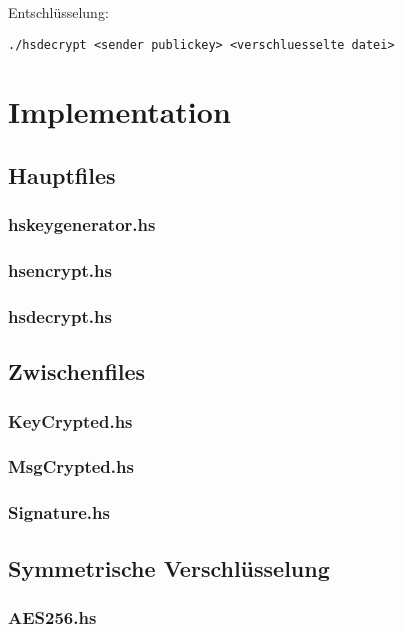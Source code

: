 \documentclass[11pt,a4paper,parskip=half]{scrartcl}
\begin{document}
Entschlüsselung:
\begin{lstlisting}
./hsdecrypt <sender publickey> <verschluesselte datei>
\end{lstlisting}

\newpage
\section{Implementation}
\subsection{Hauptfiles}
\subsubsection{hskeygenerator.hs}

\subsubsection{hsencrypt.hs}

\subsubsection{hsdecrypt.hs}

\subsection{Zwischenfiles}
\subsubsection{KeyCrypted.hs}

\subsubsection{MsgCrypted.hs}

\subsubsection{Signature.hs}

\subsection{Symmetrische Verschlüsselung}
\subsubsection{AES256.hs}

\end{document}
